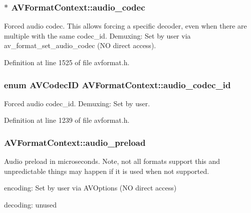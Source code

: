 \subsubsection[{\texorpdfstring{audio\+\_\+codec}{audio_codec}}]{$\ast$ A\+V\+Format\+Context\+::audio\+\_\+codec}\hypertarget{struct_a_v_format_context_ab73f76ceac8ed711c56decc2d64456f0}{}\label{struct_a_v_format_context_ab73f76ceac8ed711c56decc2d64456f0}
Forced audio codec. This allows forcing a specific decoder, even when there are multiple with the same codec\+\_\+id. Demuxing\+: Set by user via av\+\_\+format\+\_\+set\+\_\+audio\+\_\+codec (NO direct access). 

Definition at line 1525 of file avformat.\+h.

\subsubsection[{\texorpdfstring{audio\+\_\+codec\+\_\+id}{audio_codec_id}}]{\setlength{\rightskip}{0pt plus 5cm}enum {\bf A\+V\+Codec\+ID} A\+V\+Format\+Context\+::audio\+\_\+codec\+\_\+id}\hypertarget{struct_a_v_format_context_a1c99fc118bf047959a0284bffc2c1a9a}{}\label{struct_a_v_format_context_a1c99fc118bf047959a0284bffc2c1a9a}
Forced audio codec\+\_\+id. Demuxing\+: Set by user. 

Definition at line 1239 of file avformat.\+h.

\subsubsection[{\texorpdfstring{audio\+\_\+preload}{audio_preload}}]{ A\+V\+Format\+Context\+::audio\+\_\+preload}\hypertarget{struct_a_v_format_context_ac02383c2106cca8022f8a293399aed58}{}\label{struct_a_v_format_context_ac02383c2106cca8022f8a293399aed58}
Audio preload in microseconds. Note, not all formats support this and unpredictable things may happen if it is used when not supported.
\begin{DoxyItemize}
\item encoding\+: Set by user via A\+V\+Options (NO direct access)
\item decoding\+: unused 
\end{DoxyItemize}

